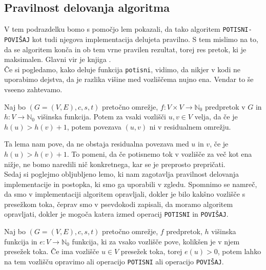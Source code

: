 \documentclass[mat1]{fmfdelo}
\newcommand{\N}{\mathbb N}
\begin{document}
\subsection{Pravilnost delovanja algoritma}

V tem podrazdelku bomo s pomočjo lem pokazali, da tako algoritem \texttt{POTISNI-POVIŠAJ} kot tudi njegova implementacija de\-lujeta pravilno. S tem mislimo na to, da se algoritem konča in ob tem vrne pravilen rezultat, torej res pretok, ki je maksimalen. Glavni vir je knjiga \cite{clrs}.\\

Če si pogledamo, kako deluje funkcija \texttt{potisni}, vidimo, da nikjer v kodi ne uporabimo dejstva, da je razlika višine med vozliščema nujno ena. Vendar to še vseeno zahtevamo.

\begin{lema}
Naj bo $(G = (V,E), c, s, t)$ pretočno omrežje, $f\colon V \times V \rightarrow \N_0$ predpretok v $G$ in $h\colon V \rightarrow \N_0$ višinska funkcija. Potem za vsaki vozlišči $u,v \in V$ velja, da če je $h(u) > h(v) + 1$, potem povezava $(u,v)$ ni v residualnem omrežju.
\end{lema}

Ta lema nam pove, da ne obstaja residualna povezava med $u$ in $v$, če je $h(u) > h(v) + 1$. To pomeni, da če potisnemo tok v vozlišče za več kot ena nižje, ne bomo naredili nič konkretnega, kar se je preprosto prepričati.\\


Sedaj si poglejmo obljubljeno lemo, ki nam zagotavlja pravilnost delovanja im\-plementacije in postopka, ki smo ga uporabili v zgledu. Spomnimo se namreč, da smo v implementaciji algoritem opravljali, dokler je bilo kakšno vozlišče s presežkom toka, čeprav smo v psevdokodi zapisali, da moramo algoritem opravljati, dokler je mogoča katera izmed operacij \texttt{POTISNI} in \texttt{POVIŠAJ}.

\begin{lema}\label{lem:potisk_ali_povisanje}
Naj bo $(G=(V,E),c,s,t)$ pretočno omrežje, $f$ predpretok, $h$ višinska funkcija in $e\colon V \rightarrow \N_0$ funkcija, ki za vsako vozlišče pove, kolikšen je v njem presežek toka. Če ima vozlišče $u\in V$ presežek toka, torej $e(u) > 0$, potem lahko na tem vozlišču opravimo ali operacijo \texttt{POTISNI} ali operacijo \texttt{POVIŠAJ}.
\end{lema}
\end{document}

